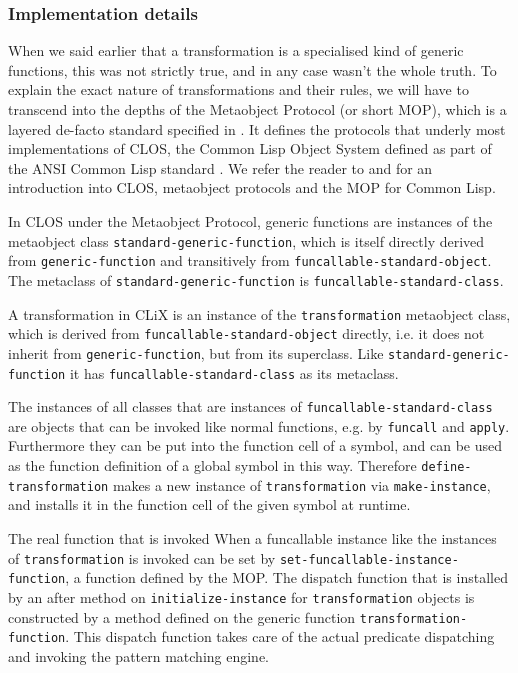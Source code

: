 \documentclass[a4paper,11pt]{scrartcl}
\begin{document}
\subsubsection{Implementation details}

When we said earlier that a transformation is a specialised kind of
generic functions, this was not strictly true, and in any case wasn't
the whole truth.  To explain the exact nature of transformations and
their rules, we will have to transcend into the depths of the
Metaobject Protocol (or short MOP), which is a layered de-facto
standard specified in \cite{AMOP}.  It defines the protocols that
underly most implementations of CLOS, the Common Lisp Object System
defined as part of the ANSI Common Lisp standard \cite{ANSI}.  We
refer the reader to \cite{CLOS} and \cite{AMOP} for an introduction
into CLOS, metaobject protocols and the MOP for Common Lisp.

In CLOS under the Metaobject Protocol, generic functions are instances
of the metaobject class \texttt{standard-generic-function}, which is
itself directly derived from \texttt{generic-function} and
transitively from \texttt{funcallable-standard-object}.  The metaclass
of \texttt{standard-generic-function} is
\texttt{funcallable-standard-class}.

A transformation in CLiX is an instance of the \texttt{transformation}
metaobject class,  which is derived from
\texttt{funcallable-standard-object} directly, i.e. it does not
inherit from \texttt{generic-function}, but from its superclass.  Like
\texttt{standard-generic-function} it has
\texttt{funcallable-standard-class} as its metaclass.

The instances of all classes that are instances of
\texttt{funcallable-standard-class} are objects that can be invoked
like normal functions, e.g. by \texttt{funcall} and \texttt{apply}.
Furthermore they can be put into the function cell of a symbol, and
can be used as the function definition of a global symbol in this
way.  Therefore \texttt{define-transformation} makes a new instance of
\texttt{transformation} via \texttt{make-instance}, and installs it in
the function cell of the given symbol at runtime.

The real function that is invoked When a funcallable instance like
the instances of \texttt{transformation} is invoked can be set by
\texttt{set-funcallable-instance-function}, a function defined by the
MOP.  The dispatch function that is installed by an after method on
\texttt{initialize-instance} for \texttt{transformation} objects is
constructed by a method defined on the generic function
\texttt{transformation-function}.  This dispatch function takes care
of the actual predicate dispatching and invoking the pattern matching
engine.
\end{document}
